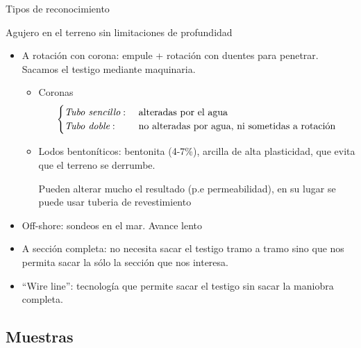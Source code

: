 \begin{mybox}{Tipos de reconocimiento}
	\begin{ldef}[Sondeos]
		Agujero en el terreno sin limitaciones de profundidad
	\end{ldef}
	\begin{itemize}
		\item A rotación con corona: empule + rotación con duentes para penetrar. Sacamos el testigo mediante maquinaria.
		\begin{itemize}
			\item Coronas 
			\begin{equation}
				\begin{cases}
					\emph{Tubo sencillo}: &\text{ alteradas por el agua}\\
					\emph{Tubo doble}: & \text{ no alteradas por agua, ni sometidas a rotación}
				\end{cases}\notag
			\end{equation}
			\item Lodos bentoníticos: bentonita (4-7\%), arcilla de alta plasticidad, que evita que el terreno se derrumbe. 
			\begin{myrem}[Lodos]
				Pueden alterar mucho el resultado (p.e permeabilidad), en su lugar se puede usar tuberia de revestimiento
			\end{myrem}
		\end{itemize}
		\item Off-shore: sondeos en el mar. Avance lento
		\item A sección completa: no necesita sacar el testigo tramo a tramo sino que nos permita sacar la sólo la sección que nos interesa.
		\item ``Wire line'': tecnología que permite sacar el testigo sin sacar la maniobra completa.
	\end{itemize}
\end{mybox}

\subsection{Muestras} %
\label{sub:muestras}


